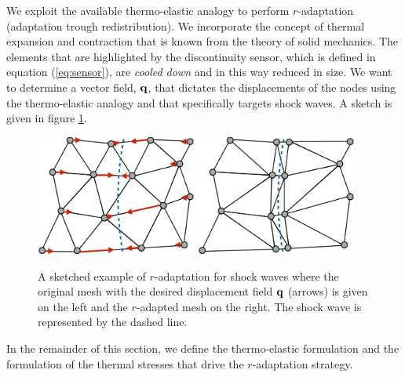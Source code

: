 \documentclass[review]{elsarticle}
\begin{document}
\par We exploit the available thermo-elastic analogy to perform $r$-adaptation (adaptation trough redistribution). We incorporate the concept of thermal expansion and contraction that is known from the theory of solid mechanics. The elements that are highlighted by the discontinuity sensor, which is defined in equation (\ref{eq:sensor}), are {\it cooled down} and in this way reduced in size. We want to determine a vector field, ${\bf q}$, that dictates the displacements of the nodes using the thermo-elastic analogy and that specifically targets shock waves. A sketch is given in figure \ref{fig:sketch}.
\begin{figure}[!htbp]
\begin{center}
\includegraphics[width=0.47\textwidth]{figures/original-mesh-vec.pdf}
\includegraphics[width=0.47\textwidth]{figures/r-mesh2.pdf}
\caption{A sketched example of $r$-adaptation for shock waves where the original mesh with the desired displacement field ${\bf q}$ (arrows) is given on the left and the $r$-adapted mesh on the right. The shock wave is represented by the dashed line.}
\label{fig:moveboundary}\label{fig:sketch}
\end{center}
\end{figure} 
In the remainder of this section, we define the thermo-elastic formulation and the formulation of the thermal stresses that drive the $r$-adaptation strategy. 
\end{document}
